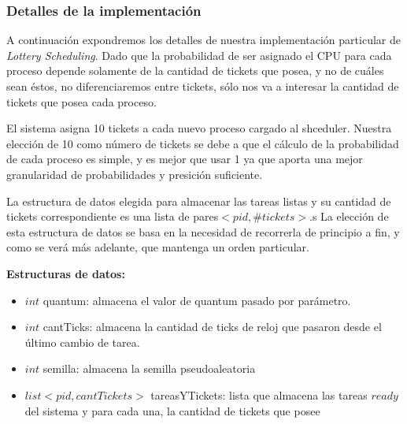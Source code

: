 \subsubsection{Detalles de la implementaci\'on}

A continuaci\'on expondremos los detalles de nuestra implementaci\'on particular de \textit{Lottery Scheduling}. Dado que la probabilidad de ser asignado el CPU para cada proceso depende solamente de la cantidad de tickets que posea, y no de cu\'ales sean \'estos, no diferenciaremos entre tickets, s\'olo nos va a interesar la cantidad de tickets que posea cada proceso.


\vspace{2mm}

El sistema asigna 10 tickets a cada nuevo proceso cargado al shceduler. Nuestra elecci\'on de 10 como n\'umero de tickets se debe a que el c\'alculo de la probabilidad de cada proceso es simple, y es mejor que usar 1 ya que aporta una mejor granularidad de probabilidades y  presici\'on suficiente. 

\vspace{2mm}

La estructura de datos elegida para almacenar las tareas listas y su cantidad de tickets correspondiente es una lista de pares$<pid, \#tickets>$.s La elecci\'on de esta estructura de datos se basa en la necesidad de recorrerla de principio a fin, y como se ver\'a m\'as adelante, que mantenga un orden particular.

\vspace{2mm}

\textbf{Estructuras de datos:}

\begin{itemize}

\item $int$ quantum: almacena el valor de quantum pasado por par\'ametro.

\item $int$ cantTicks: almacena la cantidad de ticks de reloj que pasaron desde el \'ultimo cambio de tarea.

\item $int$ semilla: almacena la semilla pseudoaleatoria

\item $list<pid, cantTickets>$ tareasYTickets: lista que almacena las tareas $ready$ del sistema y para cada una, la cantidad de tickets que posee

\end{itemize}


